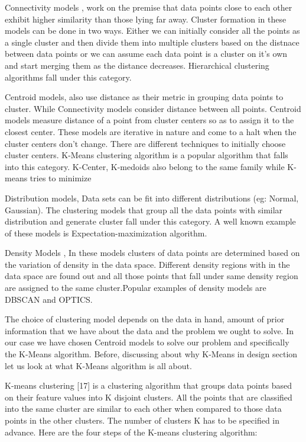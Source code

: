 Connectivity models \cite{doi:10.1093/comjnl/26.4.354}, work on the premise that data points close to each other exhibit higher similarity than those lying far away. Cluster formation in these models can be done in two ways. Either we can initially consider all the points as a single cluster and then divide them into multiple clusters based on the distnace between data points or we can assume each data point is a cluster on it's own and start merging them as the distance decreases. Hierarchical clustering algorithms fall under this category.

Centroid models, also use distance as their metric in grouping data points to cluster. While Connectivity models consider distance between all points. Centroid models measure distance of a point from cluster centers so as to assign it to the closest center. These models are iterative in nature and come to a halt when the cluster centers don't change. There are different techniques to initially choose cluster centers.  K-Means clustering algorithm \cite{Derpanis06k-meansclustering} is a popular algorithm that falls into this category. K-Center, K-medoids also belong to the same family while K-means tries to minimize 
 
Distribution models\cite{Johnson2000}, Data sets can be fit into different distributions (eg: Normal, Gaussian). The clustering models that group all the data points with similar distribution and generate cluster fall under this category. A well known example of these models is Expectation-maximization algorithm. 

Density Models \cite{thang2011anomaly}, In these models clusters of data points are determined based on the variation of density in the data space. Different density regions with in the data space are found out and all those points that fall under same density region are assigned to the same cluster.Popular examples of density models are DBSCAN and OPTICS.

The choice of clustering model depends on the data in hand, amount of prior information that we have about the data and the problem we ought to solve. In our case we have chosen Centroid models to solve our problem and specifically the K-Means algorithm. Before, discussing about why K-Means in design section let us look at what K-Means algorithm is all about.

K-means clustering [17] is a clustering algorithm that groups data points based on their feature values into K disjoint clusters. All the points that are classified into the same cluster are similar to each other when compared to those data points in the other clusters. The number of clusters K has to be specified in advance. Here are the four steps of the K-means clustering
algorithm:

